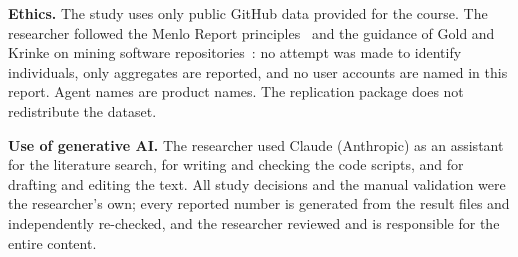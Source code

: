 \textbf{Ethics.} The study uses only public GitHub data provided for the course. The researcher followed the Menlo Report principles~\cite{dittrich2012menlo} and the guidance of Gold and Krinke on mining software repositories~\cite{gold2022ethics}: no attempt was made to identify individuals, only aggregates are reported, and no user accounts are named in this report. Agent names are product names. The replication package does not redistribute the dataset.

\textbf{Use of generative AI.} The researcher used Claude (Anthropic) as an assistant for the literature search, for writing and checking the code scripts, and for drafting and editing the text. All study decisions and the manual validation were the researcher's own; every reported number is generated from the result files and independently re-checked, and the researcher reviewed and is responsible for the entire content.
